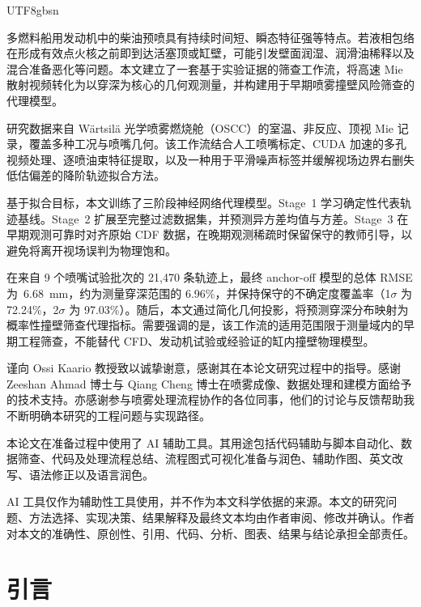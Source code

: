 \documentclass[english, 12pt, a4paper, elec, utf8, a-2b, online]{aaltothesis}
\date{7 April 2026}
\begin{document}
\ifXeTeX
\else
\begin{CJK*}{UTF8}{gbsn}
\fi

\makecoverpage
\makecopyrightpage

\begin{abstractpage}[english]
多燃料船用发动机中的柴油预喷具有持续时间短、瞬态特征强等特点。若液相包络在形成有效点火核之前即到达活塞顶或缸壁，可能引发壁面润湿、润滑油稀释以及混合准备恶化等问题。本文建立了一套基于实验证据的筛查工作流，将高速 Mie 散射视频转化为以穿深为核心的几何观测量，并构建用于早期喷雾撞壁风险筛查的代理模型。

研究数据来自 Wärtsilä 光学喷雾燃烧舱（OSCC）的室温、非反应、顶视 Mie 记录，覆盖多种工况与喷嘴几何。该工作流结合人工喷嘴标定、CUDA 加速的多孔视频处理、逐喷油束特征提取，以及一种用于平滑噪声标签并缓解视场边界右删失低估偏差的降阶轨迹拟合方法。

基于拟合目标，本文训练了三阶段神经网络代理模型。Stage~1 学习确定性代表轨迹基线。Stage~2 扩展至完整过滤数据集，并预测异方差均值与方差。Stage~3 在早期观测可靠时对齐原始 CDF 数据，在晚期观测稀疏时保留保守的教师引导，以避免将离开视场误判为物理饱和。

在来自 9 个喷嘴试验批次的 21{,}470 条轨迹上，最终 anchor-off 模型的总体 RMSE 为~\SI{6.68}{mm}，约为测量穿深范围的 6.96\%，并保持保守的不确定度覆盖率（1$\sigma$ 为 72.24\%，2$\sigma$ 为 97.03\%）。随后，本文通过简化几何投影，将预测穿深分布映射为概率性撞壁筛查代理指标。需要强调的是，该工作流的适用范围限于测量域内的早期工程筛查，不能替代 CFD、发动机试验或经验证的缸内撞壁物理模型。
\end{abstractpage}

谨向 Ossi Kaario 教授致以诚挚谢意，感谢其在本论文研究过程中的指导。感谢 Zeeshan Ahmad 博士与 Qiang Cheng 博士在喷雾成像、数据处理和建模方面给予的技术支持。亦感谢参与喷雾处理流程协作的各位同事，他们的讨论与反馈帮助我不断明确本研究的工程问题与实现路径。

本论文在准备过程中使用了 AI 辅助工具。其用途包括代码辅助与脚本自动化、数据筛查、代码及处理流程总结、流程图式可视化准备与润色、辅助作图、英文改写、语法修正以及语言润色。

AI 工具仅作为辅助性工具使用，并不作为本文科学依据的来源。本文的研究问题、方法选择、实现决策、结果解释及最终文本均由作者审阅、修改并确认。作者对本文的准确性、原创性、引用、代码、分析、图表、结果与结论承担全部责任。

\thesistableofcontents
\dothesispagenumbering{}

\section{引言}


\end{CJK*}
\end{document}
